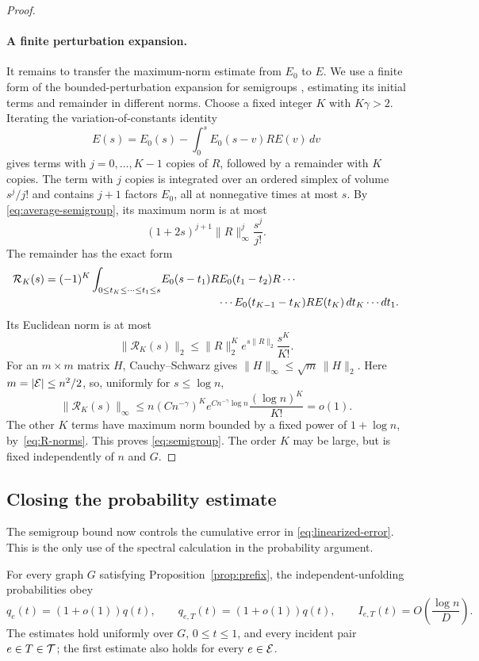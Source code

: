 \begin{proof}
\paragraph{A finite perturbation expansion.}
It remains to transfer the maximum-norm estimate from $E_0$ to $E$.
We use a finite form of the bounded-perturbation expansion for semigroups
\cite[Theorem~III.1.10]{EngelNagel2000}, estimating its initial terms
and remainder in different norms.
Choose a fixed integer $K$ with $K\gamma>2$.  Iterating the
variation-of-constants identity
\[
 E(s)=E_0(s)-\int_0^s E_0(s-v)R E(v)\,dv
\]
gives terms with $j=0,\ldots,K-1$ copies of $R$, followed by a
remainder with $K$ copies.  The term with $j$ copies is integrated
over an ordered simplex of volume $s^j/j!$ and contains $j+1$
factors $E_0$, all at nonnegative times at most $s$.  By
\eqref{eq:average-semigroup}, its maximum norm is at most
\[
 (1+2s)^{j+1}\lVert R\rVert_\infty^j\frac{s^j}{j!}.
\]
The remainder has the exact form
\[
 \begin{split}
 \mathcal R_K(s)=(-1)^K
 \int_{0\le t_K\le\cdots\le t_1\le s}
 &E_0(s-t_1)R E_0(t_1-t_2)R\cdots\\[-2pt]
 &\hspace{18mm}\cdots E_0(t_{K-1}-t_K)R E(t_K)\,
 dt_K\cdots dt_1.
 \end{split}
\]
Its Euclidean norm is at most
\[
 \lVert\mathcal R_K(s)\rVert_2
 \le\lVert R\rVert_2^K e^{s\lVert R\rVert_2}\frac{s^K}{K!}.
\]
For an $m\times m$ matrix $H$, Cauchy--Schwarz gives
$\lVert H\rVert_\infty\le\sqrt m\,\lVert H\rVert_2$.
Here $m=|\mathcal E|\le n^2/2$, so, uniformly for $s\le\log n$,
\[
 \lVert\mathcal R_K(s)\rVert_\infty
 \le n(Cn^{-\gamma})^K
       e^{Cn^{-\gamma}\log n}\frac{(\log n)^K}{K!}
 =o(1).
\]
The other $K$ terms have maximum norm bounded by a fixed power of
$1+\log n$, by~\eqref{eq:R-norms}.  This proves
\eqref{eq:semigroup}.  The order $K$ may be large, but is fixed
independently of $n$ and $G$.
\end{proof}

\subsection{Closing the probability estimate}

The semigroup bound now controls the cumulative error in
\eqref{eq:linearized-error}.  This is the only use of the spectral
calculation in the probability argument.

\begin{proposition}\label{prop:unfolding}
For every graph $G$ satisfying Proposition~\ref{prop:prefix}, the
independent-unfolding probabilities obey
\begin{equation}\label{eq:unfolding-asymptotics}
 q_e(t)=(1+o(1))q(t),\qquad
 q_{e,T}(t)=(1+o(1))q(t),\qquad
 I_{e,T}(t)=O\!\left(\frac{\log n}{D}\right).
\end{equation}
The estimates hold uniformly over $G$, $0\le t\le1$, and every
incident pair $e\in T\in\mathcal T$; the first estimate also holds for every
$e\in\mathcal E$.
\end{proposition}

